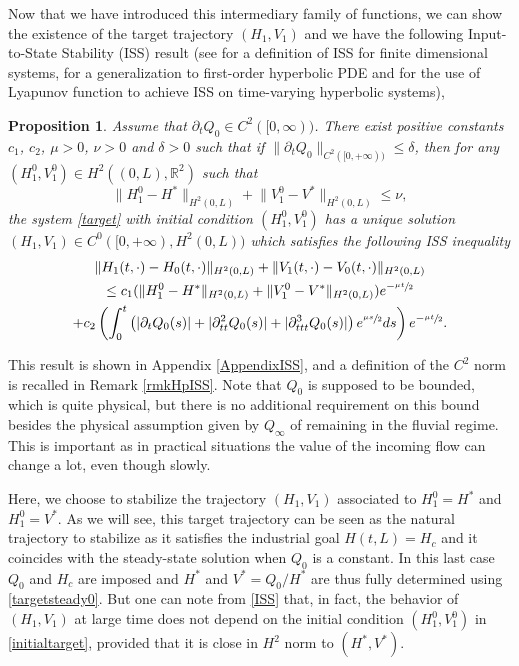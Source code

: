 \documentclass[JEP,XML,SOM,Unicode]{cedram}
\newtheorem{prop}[thm]{Proposition}
\theoremstyle{definition}
\begin{document}
Now that we have introduced this intermediary family of functions, we can show the existence of the target trajectory $(H_{1},V_{1})$ and
we have the following Input-to-State Stability (ISS) result {(see \cite{Sontag} for a definition of ISS for finite dimensional systems,
\cite[Chap.\,1, Chap.\,3]{IassonKrstic} for a generalization to first-order hyperbolic PDE and \cite{PrieurISS} for the use of Lyapunov function to achieve ISS on time-varying hyperbolic systems)},
\begin{prop}\label{propISS}
Assume that $\partial_{t}Q_{0}\in C^{2}([0,\infty))$. There exist positive constants $c_{1}$, $c_{2}$,
$\mu>0$, $\nu>0$ and $\delta>0$ such that if
$\lVert\partial_{t}Q_{0}\rVert_{C^{2}([0,+\infty))}\leq\delta$, then for any $(H_{1}^{0},V_{1}^{0})\in H^{2}((0,L),{\mathbb{R}^{2}})$ such that
\begin{equation*}
\lVert H_{1}^{0}-H^{*}\rVert_{H^{2}(0,L)}+\lVert V_{1}^{0}-V^{*}\rVert_{H^{2}(0,L)}\leq \nu,
\end{equation*}
the system \eqref{target} with initial condition $(H_{1}^{0},V_{1}^{0})$ has a unique solution $(H_{1},V_{1})\in C^{0}([0,+\infty),H^{2}(0,L))$ which satisfies the following ISS inequality
{\begin{multline}
\label{ISS}
\lVert H_{1}(t,\cdot)-H_{0}(t,\cdot)\rVert_{H^{2}(0,L)}+\lVert V_{1}(t,\cdot)-V_{0}(t,\cdot)\rVert_{H^{2}(0,L)}\\
\leq c_{1}(\lVert H_{1}^{0}-H^{*}\rVert_{H^{2}(0,L)}+\lVert V_{1}^{0}-V^{*}\rVert_{H^{2}(0,L)})e^{-\sfrac{\mu t}{2}}\\
+c_{2}\left(\int_{0}^{t}\left(|\partial_{t}Q_{0}(s)|+|\partial_{tt}^{2}Q_{0}(s)|+|\partial_{ttt}^{3}Q_{0}(s)|\right)e^{\sfrac{\mu s}{2}}ds\right)e^{-\sfrac{\mu t}{2}}.
\end{multline}}
\end{prop}
This result is shown in Appendix \ref{AppendixISS}, {and a definition of the $C^{2}$ norm is recalled in Remark \ref{rmkHpISS}}. Note that $Q_{0}$ is supposed to be bounded, which is quite physical, but there is no additional requirement on this bound besides the physical assumption given by $Q_{\infty}$ of remaining in the fluvial regime. This is important as in practical
situations the value of the incoming flow can change a lot, even though slowly.

Here, we {choose} to stabilize the trajectory $(H_{1},V_{1})$ associated to $H_{1}^{0}=H^{*}$ and $H_{1}^{0}=V^{*}$. As we will see, this target trajectory can be seen as the natural trajectory to stabilize as it satisfies the industrial goal $H(t,L)=H_{c}$
and it coincides with the steady-state solution when $Q_{0}$ is a constant.
{In this last case $Q_{0}$ and $H_{c}$ are imposed and $H^{*}$ and $V^{*}=Q_{0}/H^{*}$ are thus fully determined using \eqref{targetsteady0}.}
But one can note from \eqref{ISS} that, in fact, the behavior of $(H_{1},V_{1})$ at large time does not depend on the initial condition $(H_{1}^{0},V_{1}^{0})$ in \eqref{initialtarget}, provided that it is close in $H^{2}$ norm to $(H^{*},V^{*})$.
\end{document}
